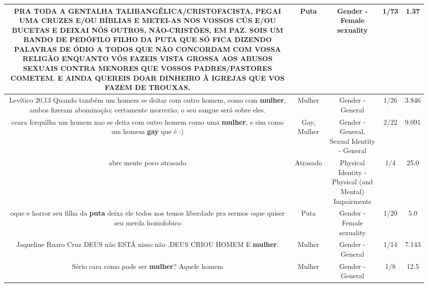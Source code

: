 \documentclass[11pt]{article}
\newlength\mylength
\begin{document}
\begin{center}
\begin{longtable}{|C{.65\mylength}|C{.30\mylength}|C{.12\mylength}|C{.12\mylength}|C{.12\mylength}|}
  \small PRA TODA A GENTALHA TALIBANGÉLICA/CRISTOFACISTA, PEGAI UMA CRUZES E/OU BÍBLIAS E METEI-AS NOS VOSSOS CÚS E/OU BUCETAS E DEIXAI NÓS OUTROS, NÃO-CRISTÕES, EM PAZ. SOIS UM BANDO DE PEDÓFILO FILHO DA \textbf{PUTA} QUE SÓ FICA DIZENDO PALAVRAS DE ÓDIO A TODOS QUE NÃO CONCORDAM COM VOSSA RELIGÃO ENQUANTO VÓS FAZEIS VISTA GROSSA AOS ABUSOS SEXUAIS CONTRA MENORES QUE VOSSOS PADRES/PASTORES COMETEM. E AINDA QUEREIS DOAR DINHEIRO À IGREJAS QUE VOS FAZEM DE TROUXAS.\normalsize   & Puta & Gender - Female sexuality & 1/73 & 1.37 \\  \hline
  \small Levítico 20,13 Quando também um homem se deitar com outro homem, como com \textbf{mulher}, ambos fizeram abominação; certamente morrerão; o seu sangue será sobre eles.\normalsize   & Mulher & Gender - General & 1/26 & 3.846 \\  \hline
  \small ceara forquilha um homem nao se deita com outro homem como uma \textbf{mulher}, e sim como um homem \textbf{gay} que é :)\normalsize   & Gay, Mulher & Gender - General, Sexual Identity - General & 2/22 & 9.091 \\  \hline
  \small abre mente poco atrasado\normalsize   & Atrasado & Physical Identity - Physical (and Mental) Impairments & 1/4 & 25.0 \\  \hline
  \small oque e horror seu filha da \textbf{puta} deixa ele todos nos temos   liberdade pra sermos oque quiser seu merda homofobico\normalsize   & Puta & Gender - Female sexuality & 1/20 & 5.0 \\  \hline
  \small Jaqueline Ruaro Cruz DEUS não  ESTÁ nisso não .DEUS CRIOU  HOMEM E \textbf{mulher}.\normalsize   & Mulher & Gender - General & 1/14 & 7.143 \\  \hline
  \small Sério cara como pode ser \textbf{mulher}? Aquele homem\normalsize   & Mulher & Gender - General & 1/8 & 12.5 \\  \hline

\end{longtable}
\end{center}
\end{document}
